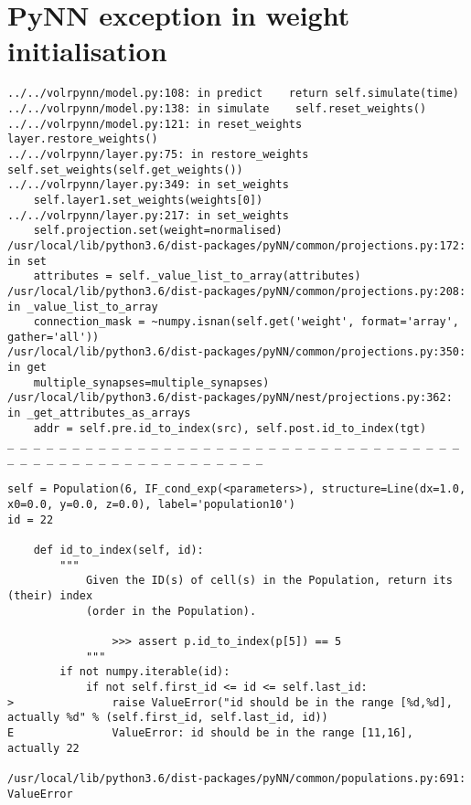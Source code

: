 


\section{PyNN exception in weight initialisation} \label{sec:pynn-exception}
\begin{lstlisting}[caption={PyNN exception when performing weight
initialisation during a test in \texttt{test\_merge.py}.}]
../../volrpynn/model.py:108: in predict    return self.simulate(time)                                                                                         
../../volrpynn/model.py:138: in simulate    self.reset_weights()
../../volrpynn/model.py:121: in reset_weights    layer.restore_weights()                                                                                            
../../volrpynn/layer.py:75: in restore_weights    self.set_weights(self.get_weights())
../../volrpynn/layer.py:349: in set_weights
    self.layer1.set_weights(weights[0])
../../volrpynn/layer.py:217: in set_weights
    self.projection.set(weight=normalised)
/usr/local/lib/python3.6/dist-packages/pyNN/common/projections.py:172: in set                                          
    attributes = self._value_list_to_array(attributes)
/usr/local/lib/python3.6/dist-packages/pyNN/common/projections.py:208: in _value_list_to_array                         
    connection_mask = ~numpy.isnan(self.get('weight', format='array', gather='all'))                                   
/usr/local/lib/python3.6/dist-packages/pyNN/common/projections.py:350: in get                                          
    multiple_synapses=multiple_synapses)
/usr/local/lib/python3.6/dist-packages/pyNN/nest/projections.py:362: in _get_attributes_as_arrays                      
    addr = self.pre.id_to_index(src), self.post.id_to_index(tgt)                                                       
_ _ _ _ _ _ _ _ _ _ _ _ _ _ _ _ _ _ _ _ _ _ _ _ _ _ _ _ _ _ _ _ _ _ _ _ _ _ _ _ _ _ _ _ _ _ _ _ _ _ _ _ _ _ _          

self = Population(6, IF_cond_exp(<parameters>), structure=Line(dx=1.0, x0=0.0, y=0.0, z=0.0), label='population10')    
id = 22

    def id_to_index(self, id):
        """
            Given the ID(s) of cell(s) in the Population, return its (their) index
            (order in the Population).
    
                >>> assert p.id_to_index(p[5]) == 5
            """
        if not numpy.iterable(id):
            if not self.first_id <= id <= self.last_id:
>               raise ValueError("id should be in the range [%d,%d], actually %d" % (self.first_id, self.last_id, id))
E               ValueError: id should be in the range [11,16], actually 22

/usr/local/lib/python3.6/dist-packages/pyNN/common/populations.py:691: ValueError
\end{lstlisting}
